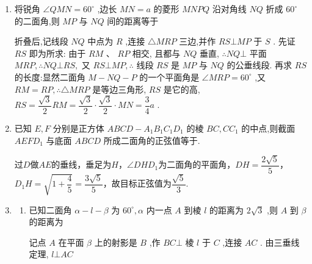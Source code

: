 \begin{enumerate}
\begin{jieda}
        $\therefore {AD} \bot$ 平面 ${BDC}$ , $\therefore$ 二面角 $B - {DA} - C$ 的一个平面角是 $\angle {BDC} = {90}^{ \circ  }, \bigtriangleup  {BDC}$ 是等腰直角三角形. 折叠后,等腰三角形 ${ABC}$ 中, ${AE}$ 是底边 ${BC}$ 上的中线,故 ${AE} \bot  {BC},{AE}$ 即为所求距离. $\operatorname{Rt} \bigtriangleup  {ADE}$ 中, ${AD} = \dfrac{\sqrt{3}}{2},{DE} = \dfrac{DB}{\sqrt{2}} = \dfrac{\sqrt{2}}{4},{AE}$  $= \sqrt{A{D}^{2} + D{E}^{2}} = \dfrac{\sqrt{14}}{4}.$
    \end{jieda}
    
    \item 将锐角 $\angle {QMN} = {60}^{ \circ  }$ ,边长 ${MN} = a$ 的菱形 ${MNPQ}$ 沿对角线 ${NQ}$ 折成 ${60}^{ \circ  }$ 的二面角,则 ${MP}$ 与 ${NQ}$ 间的距离等于
    \begin{jieda}
        折叠后,记线段 ${NQ}$ 中点为 $R$ ,连接 $\bigtriangleup {MRP}$ 三边,并作 ${RS}\bot {MP}$ 于 $S$ . 先证 ${RS}$ 即为所求: 由于 ${RM}$ 、 ${RP}$ 相交, 且都与 ${NQ}$ 垂直, $\therefore {NQ} \bot$ 平面 ${MRP},\therefore {NQ} \bot  {RS},$ 又 ${RS} \bot  {MP},\therefore$ 线段 ${RS}$ 是 ${MP}$ 与 ${NQ}$ 的公垂线段. 再求 ${RS}$ 的长度:显然二面角 $M - {NQ} - P$ 的一个平面角是 $\angle {MRP} = {60}^{ \circ  }$ ,又 ${RM} = {RP},\therefore \bigtriangleup {MRP}$ 是等边三角形, ${RS}$ 是它的高, ${RS} = \dfrac{\sqrt{3}}{2}{RM} = \dfrac{\sqrt{3}}{2} \cdot  \dfrac{\sqrt{3}}{2} \cdot  {MN} = \dfrac{3}{4}a$ .
    \end{jieda}
    
    \item 已知 $E,F$ 分别是正方体 ${ABCD} - {A}_{1}{B}_{1}{C}_{1}{D}_{1}$ 的棱 ${BC},C{C}_{1}$ 的中点,则截面 ${AEF}{D}_{1}$ 与底面 ${ABCD}$ 所成二面角的正弦值等于.
    \begin{jieda}
        过$D$做$AE$的垂线，垂足为$H$，$\angle{DHD_1}$为二面角的平面角，$DH = \dfrac{2\sqrt{5}}{5}$，$D_1H = \sqrt{1+\dfrac{4}{5}} = \dfrac{3\sqrt{5}}{5}$，故目标正弦值为$\dfrac{\sqrt{5}}{3}$.
    \end{jieda}
    \item 
    \begin{enumerate}
        \item 已知二面角 $\alpha  - l - \beta$ 为 ${60}^{ \circ  },\alpha$ 内一点 $A$ 到棱 $l$ 的距离为 $2\sqrt{3}$ ,则 $A$ 到 $\beta$ 的距离为
        \begin{jieda}
            记点 $A$ 在平面 $\beta$ 上的射影是 $B$ ,作 ${BC} \bot$ 棱 $l$ 于 $C$ ,连接 ${AC}$ . 由三垂线定理, $l \bot  {AC}$


\end{jieda}
\end{enumerate}
\end{enumerate}
